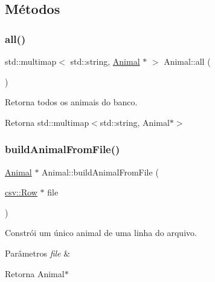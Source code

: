 \subsection{Métodos}
\mbox{\label{classAnimal_a342dd3f74afeeadd169e792db6f04845}} 
\subsubsection{\texorpdfstring{all()}{all()}}
{\footnotesize\ttfamily std\+::multimap$<$ std\+::string, \hyperlink{classAnimal}{Animal} $\ast$ $>$ Animal\+::all (\begin{DoxyParamCaption}{ }\end{DoxyParamCaption})\hspace{0.3cm}{\ttfamily [static]}}



Retorna todos os animais do banco. 

\begin{DoxyReturn}{Retorna}
std\+::multimap$<$std\+::string, Animal$\ast$$>$ 
\end{DoxyReturn}
\mbox{\label{classAnimal_a8b0e3217c72fa8de0316828c6385dd99}} 
\subsubsection{\texorpdfstring{build\+Animal\+From\+File()}{buildAnimalFromFile()}}
{\footnotesize\ttfamily \hyperlink{classAnimal}{Animal} $\ast$ Animal\+::build\+Animal\+From\+File (\begin{DoxyParamCaption}\item[{\hyperlink{classcsv_1_1Row}{csv\+::\+Row} $\ast$}]{file }\end{DoxyParamCaption})\hspace{0.3cm}{\ttfamily [static]}}



Constrói um único animal de uma linha do arquivo. 


\begin{DoxyParams}{Parâmetros}
{\em file} & \\
\hline
\end{DoxyParams}
\begin{DoxyReturn}{Retorna}
Animal$\ast$ 
\end{DoxyReturn}
\mbox{\label{classAnimal_aac52a938d9c55280467c9f6e9564df95}} 
